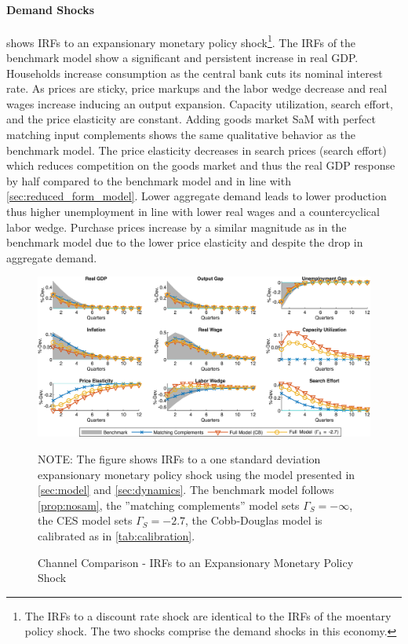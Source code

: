 \documentclass[12pt,3p,authoryear,review]{elsarticle}
\begin{document}
\paragraph{Demand Shocks}%
 shows IRFs to an expansionary monetary policy shock\footnote{The IRFs to a discount rate shock are identical to the IRFs of the moentary policy shock. The two shocks comprise the demand shocks in this economy.}. The IRFs of the benchmark model show a significant and persistent increase in real GDP. Households increase consumption as the central bank cuts its nominal interest rate. As prices are sticky, price markups and the labor wedge decrease and real wages increase inducing an output expansion. Capacity utilization, search effort, and the price elasticity are constant. Adding goods market SaM with perfect matching input complements shows the same qualitative behavior as the benchmark model. The price elasticity decreases in search prices (search effort) which reduces competition on the goods market and thus the real GDP response by half compared to the benchmark model and in line with \cref{sec:reduced_form_model}. Lower aggregate demand leads to lower production thus higher unemployment in line with lower real wages and a countercyclical labor wedge. Purchase prices increase by a similar magnitude as in the benchmark model due to the lower price elasticity and despite the drop in aggregate demand.\\%
\begin{figure}[t]%
	\centering%
	\caption{Channel Comparison - IRFs to an Expansionary Monetary Policy Shock}\label{fig:irf_default_policy}%
	\vspace{-0.1in}%
	\includegraphics[width=\textwidth]{fig_5_irf_default_policy.png}%
	\vspace{-0.1in}%
	{\tiny \singlespacing NOTE: The figure shows IRFs to a one standard deviation expansionary monetary policy shock using the model presented in \cref{sec:model} and \cref{sec:dynamics}. The benchmark model follows \cref{prop:nosam}, the ''matching complements'' model sets $\Gamma_S = -\infty$, the CES model sets $\Gamma_S = -2.7$, the Cobb-Douglas model is calibrated as in \cref{tab:calibration}.\par}%
\end{figure}%
\end{document}
